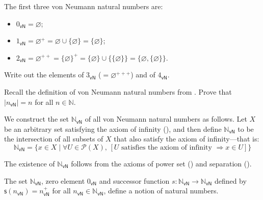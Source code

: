 \begin{example}
The first three von Neumann natural numbers are:
\begin{itemize}
\item $0_{\mathsf{vN}} = \varnothing$;
\item $1_{\mathsf{vN}} = \varnothing^+ = \varnothing \cup \{ \varnothing \} = \{ \varnothing \}$;
\item $2_{\mathsf{vN}} = \varnothing^{++} = \{ \varnothing \}^+ = \{ \varnothing \} \cup \{ \{ \varnothing \} \} = \{ \varnothing, \{ \varnothing \} \}$.
\end{itemize}
\end{example}

\begin{exercise}
Write out the elements of $3_{\mathsf{vN}}$ ($=\varnothing^{+++}$) and of $4_{\mathsf{vN}}$.
\end{exercise}

\begin{exercise}
\label{exSizeOfVonNeumannOrdinals}
Recall the definition of von Neumann natural numbers from . Prove that $|n_{\mathsf{vN}}| = n$ for all $n \in \mathbb{N}$.
\end{exercise}

\begin{construction}
\label{cnsNaturalNumbersVonNeumann}
We construct the set $\mathbb{N}_{\mathsf{vN}}$ of all von Neumann natural numbers as follows. Let $X$ be an arbitrary set satisfying the axiom of infinity (), and then define $\mathbb{N}_{\mathsf{vN}}$ to be the intersection of all subsets of $X$ that also satisfy the axiom of infinity---that is:
\[ \mathbb{N}_{\mathsf{vN}} = \{ x \in X \mid \forall U \in \mathcal{P}(X),\, [U \text{ satisfies the axiom of infinity } \Rightarrow x \in U ] \} \]
\end{construction}

The existence of $\mathbb{N}_{\mathsf{vN}}$ follows from the axioms of power set () and separation ().

\begin{theorem}
\label{thmVonNeumannNaturalNumbers}
The set $\mathbb{N}_{\mathsf{vN}}$, zero element $0_{\mathsf{vN}}$ and successor function $s : \mathbb{N}_{\mathsf{vN}} \to \mathbb{N}_{\mathsf{vN}}$ defined by $\mathsf{s}(n_{\mathsf{vN}}) = n_{\mathsf{vN}}^+$ for all $n_{\mathsf{vN}} \in \mathbb{N}_{\mathsf{vN}}$, define a notion of natural numbers.
\end{theorem}

